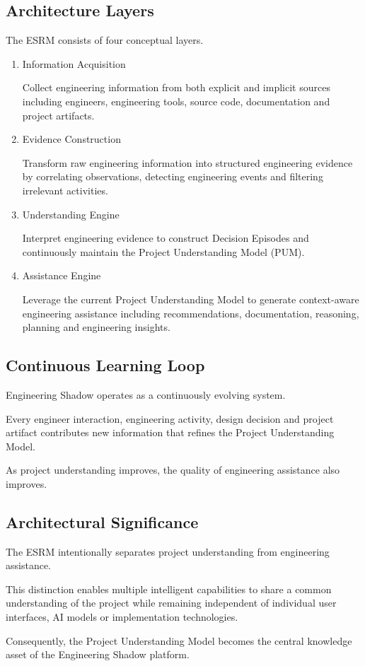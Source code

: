 \subsection{Architecture Layers}

The ESRM consists of four conceptual layers.

\begin{enumerate}

\item Information Acquisition

Collect engineering information from both explicit and implicit sources including engineers, engineering tools, source code, documentation and project artifacts.

\item Evidence Construction

Transform raw engineering information into structured engineering evidence by correlating observations, detecting engineering events and filtering irrelevant activities.

\item Understanding Engine

Interpret engineering evidence to construct Decision Episodes and continuously maintain the Project Understanding Model (PUM).

\item Assistance Engine

Leverage the current Project Understanding Model to generate context-aware engineering assistance including recommendations, documentation, reasoning, planning and engineering insights.

\end{enumerate}

\vspace{0.4cm}

\subsection{Continuous Learning Loop}

Engineering Shadow operates as a continuously evolving system.

Every engineer interaction, engineering activity, design decision and project artifact contributes new information that refines the Project Understanding Model.

As project understanding improves, the quality of engineering assistance also improves.

\vspace{0.4cm}

\subsection{Architectural Significance}

The ESRM intentionally separates project understanding from engineering assistance.

This distinction enables multiple intelligent capabilities to share a common understanding of the project while remaining independent of individual user interfaces, AI models or implementation technologies.

Consequently, the Project Understanding Model becomes the central knowledge asset of the Engineering Shadow platform.
